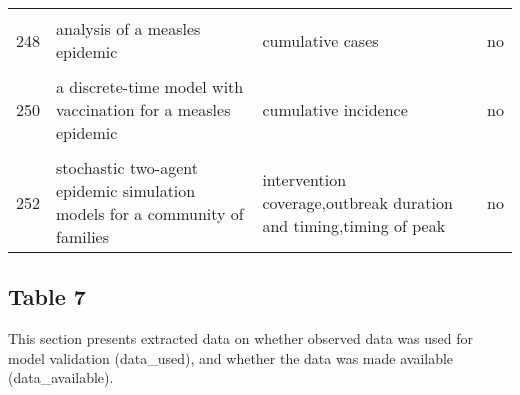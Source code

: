 \documentclass[
]{article}
\begin{document}
\begin{landscape}
\begin{longtable}{l>{\raggedright\arraybackslash}p{4cm}>{\raggedright\arraybackslash}p{6cm}l}
\cellcolor{gray!6}{247} & \cellcolor{gray!6}{an evaluation of alternate control strategies for foot-and-mouth disease in australia: a regional approach} & \cellcolor{gray!6}{outbreak duration and timing,final epidemic size,cost,compensation,control costs,output effects,income effects,employment effects} & \cellcolor{gray!6}{no}\\
248 & analysis of a measles epidemic & cumulative cases & no\\
\cellcolor{gray!6}{249} & \cellcolor{gray!6}{a model of the transmission of dengue fever with an evaluation of the impact of ultra-low volume (ulv) insecticide applications on dengue epidemics} & \cellcolor{gray!6}{cases averted,timing of peak,peak magnitude,population immunity} & \cellcolor{gray!6}{yes}\\
250 & a discrete-time model with vaccination for a measles epidemic & cumulative incidence & no\\
\addlinespace
\cellcolor{gray!6}{251} & \cellcolor{gray!6}{a stochastic model of epidemics in military recruits} & \cellcolor{gray!6}{outbreak duration and timing} & \cellcolor{gray!6}{no}\\
252 & stochastic two-agent epidemic simulation models for a community of families & intervention coverage,outbreak duration and timing,timing of peak & no\\*
\end{longtable}
\endgroup{}
\end{landscape}

\hypertarget{table-7}{%
\subsection{Table 7}\label{table-7}}

This section presents extracted data on whether observed data was used
for model validation (data\_used), and whether the data was made
available (data\_available).
\end{document}
